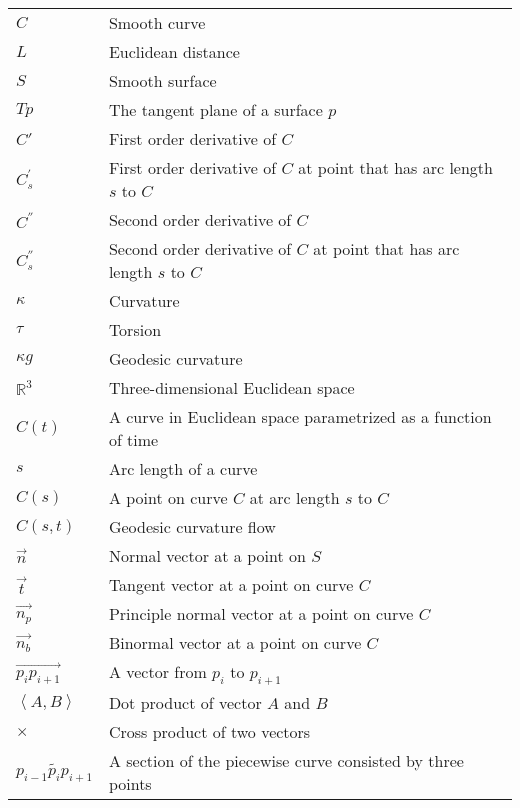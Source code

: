 \begin{longtable}{ m{20mm}|m{90mm} }
  $C$ & Smooth curve \\ 
  $L$ & Euclidean distance \\
  $S$ & Smooth surface\\
  $T{p}$ & The tangent plane of a surface $p$\\
  $C'$ & First order derivative of $C$ \\
  $C^{'}_{s}$ &First order derivative of $C$ at point that has arc length $s$ to $C$ \\
  $C^{''}$ & Second order derivative of $C$\\
  $C^{''}_{s}$ & Second order derivative of $C$ at point that has arc length $s$ to $C$ \\
  $\kappa$ & Curvature \\
  $\tau$ & Torsion \\
  $\kappa{g}$ & Geodesic curvature \\
  $\mathbb{R}^{3}$ & Three-dimensional Euclidean space \\
  $C(t)$ & A curve in Euclidean space parametrized as a function of time \\
  $s$ & Arc length of a curve \\
  $C(s)$ & A point on curve $C$ at arc length $s$ to $C$ \\
%
%
  $C(s,t)$ & Geodesic curvature flow \\
  $\vec{n}$ & Normal vector at a point on $S$ \\
  $\vec{t}$ & Tangent vector at a point on curve $C$\\
  $\vec{n_{p}}$ & Principle normal vector at a point on curve $C$\\
  $\vec{n_{b}}$ & Binormal vector at a point on curve $C$\\
  $\overrightarrow{p_{i}p_{i+1}}$ & A vector from $p_{i}$ to $p_{i+1}$ \\
  $\left \langle A,B \right \rangle$ & Dot product of vector $A$ and $B$ \\
  $\times$ & Cross product of two vectors\\
  $\widetilde{p_{i-1}p_{i}p_{i+1}}$ & A section of the piecewise curve consisted by three points\\

\end{longtable}
